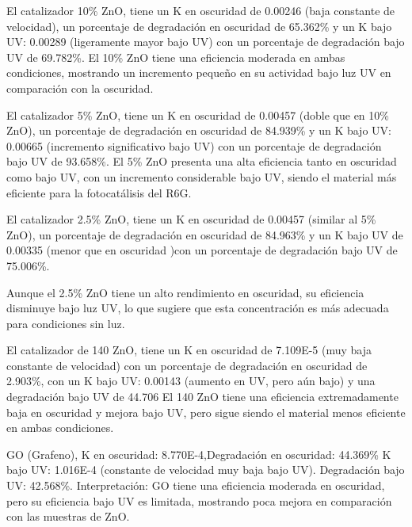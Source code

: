 \documentclass[12pt]{article}
\begin{document}
El catalizador 10\% ZnO, tiene un K en oscuridad de 0.00246 (baja constante de velocidad), un porcentaje de degradación en oscuridad de 65.362\% y un K bajo UV: 0.00289 (ligeramente mayor bajo UV) con un porcentaje de degradación bajo UV de 69.782\%.
El 10\% ZnO tiene una eficiencia moderada en ambas condiciones, mostrando un incremento pequeño en su actividad bajo luz UV en comparación con la oscuridad.\vspace{1em} %

El catalizador 5\% ZnO, tiene un K en oscuridad de 0.00457 (doble que en 10\% ZnO), un porcentaje de degradación en oscuridad de 84.939\% y un K bajo UV: 0.00665 (incremento significativo bajo UV) con un porcentaje de degradación bajo UV de 93.658\%.
 El 5\% ZnO presenta una alta eficiencia tanto en oscuridad como bajo UV, con un incremento considerable bajo UV, siendo el material más eficiente para la fotocatálisis del R6G.\vspace{1em} %
 
El catalizador 2.5\% ZnO, tiene un K en oscuridad de 0.00457 (similar al 5\% ZnO), un porcentaje de degradación en oscuridad de 84.963\% y un K bajo UV de 0.00335 (menor que en oscuridad )con un porcentaje de degradación bajo UV de 75.006\%.\vspace{1em} %

Aunque el 2.5\% ZnO tiene un alto rendimiento en oscuridad, su eficiencia disminuye bajo luz UV, lo que sugiere que esta concentración es más adecuada para condiciones sin luz.
\vspace{1em} %

El catalizador de 140 ZnO, tiene un K en oscuridad de 7.109E-5 (muy baja constante de velocidad) con un porcentaje de degradación en oscuridad de 2.903\%, con un K bajo UV: 0.00143 (aumento en UV, pero aún bajo) y una degradación bajo UV de 44.706%
El 140 ZnO tiene una eficiencia extremadamente baja en oscuridad y mejora bajo UV, pero sigue siendo el material menos eficiente en ambas condiciones.\vspace{1em} %


GO (Grafeno), K en oscuridad: 8.770E-4,Degradación en oscuridad: 44.369\% K bajo UV: 1.016E-4 (constante de velocidad muy baja bajo UV). Degradación bajo UV: 42.568\%. Interpretación: GO tiene una eficiencia moderada en oscuridad, pero su eficiencia bajo UV es limitada, mostrando poca mejora en comparación con las muestras de ZnO.
\end{document}
